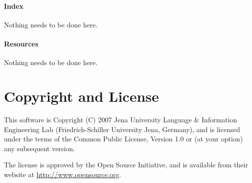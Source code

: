 \documentclass[11pt,a4paper,halfparskip]{scrartcl}
\begin{document}
\paragraph{Index}
Nothing needs to be done here.

\paragraph{Resources}
Nothing needs to be done here.


\section{Copyright and License}
This software is Copyright (C) 2007 Jena University Language \& Information
Engineering Lab (Friedrich-Schiller University Jena, Germany), and is
licensed under the terms of the Common Public License, Version 1.0 or (at
your option) any subsequent version.

The license is approved by the Open Source Initiative, and is
available from their website at \url{http://www.opensource.org}.



\end{document}
